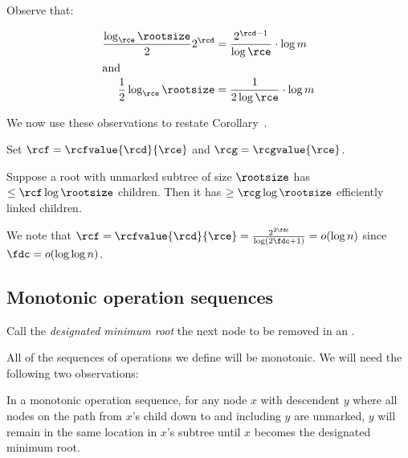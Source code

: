 \begin{fullonly}
Observe that:

\begin{align*}
 \frac{\log_{\rce }{\rootsize}}{2}2^{\rcd} {}
& = \frac{2^{\rcd-1}}{\log \rce}\cdot{ \log m }
\\ \intertext{and}
\frac{1}{2} \log_{\rce } \rootsize &=
\frac{1}{2 \log \rce}\cdot {\log m}
\end{align*}



We now use these observations to restate Corollary~. 
\end{fullonly}
Set $\rcf=\rcfvalue{\rcd}{\rce}$ and $\rcg=\rcgvalue{\rce}$. 

\begin{cor}
Suppose a root with unmarked subtree of size $\rootsize$ has $\leq {\rcf  \log \rootsize}$ children. Then it has $\geq  {\rcg \log \rootsize}$ efficiently linked children. 
\end{cor}

We note that $\rcf =\rcfvalue{\rcd}{\rce}=\frac{2^{2\fdc}}{\log (2 \fdc+1)}=o(\log n )$ since $\fdc=o(\log \log n)$.


\subsection{Monotonic operation sequences} 

Call the \emph{designated minimum root} the next node to be removed in an \opEm.
\begin{fullonly}
\end{fullonly}
All of the sequences of operations we define will be monotonic. We will need the following two observations:


\begin{obs} In a monotonic operation sequence, for any node $x$ with descendent $y$ where all nodes on the path from $x$'s child down to and including  $y$ are unmarked, $y$ will remain in the same location in $x$'s subtree until $x$ becomes the designated minimum root.
\end {obs}

